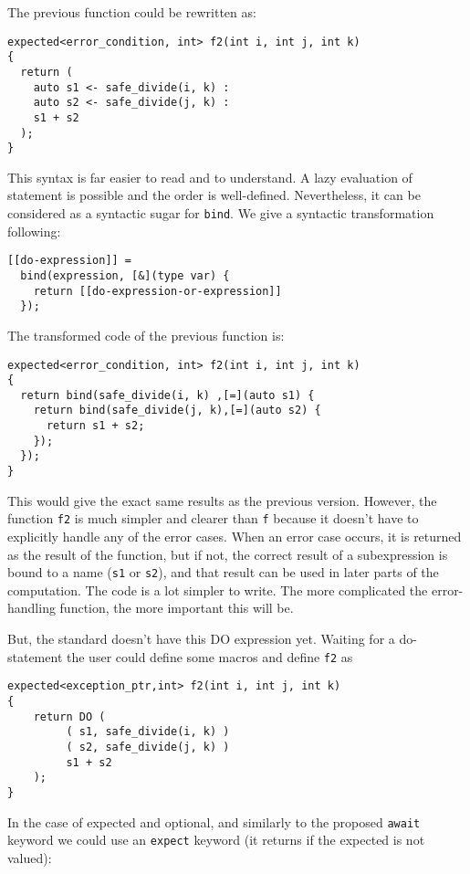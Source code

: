 \documentclass[a4paper,10pt]{article}
\newcommand{\cpp}[1]{\lstinline{#1}}
\begin{document}
\noindent
The previous function could be rewritten as:

\begin{lstlisting}
expected<error_condition, int> f2(int i, int j, int k)
{
  return (
    auto s1 <- safe_divide(i, k) :
    auto s2 <- safe_divide(j, k) :
    s1 + s2
  );
}
\end{lstlisting}

This syntax is far easier to read and to understand. A lazy evaluation of statement is possible and the order is well-defined. Nevertheless, it can be considered as a syntactic sugar for \cpp{bind}. We give a syntactic transformation following:

\begin{lstlisting}
[[do-expression]] =
  bind(expression, [&](type var) {
    return [[do-expression-or-expression]]
  });
\end{lstlisting}
\noindent
The transformed code of the previous function is:

\begin{lstlisting}
expected<error_condition, int> f2(int i, int j, int k)
{
  return bind(safe_divide(i, k) ,[=](auto s1) {
    return bind(safe_divide(j, k),[=](auto s2) {
      return s1 + s2;
    });
  }); 
}
\end{lstlisting}

This would give the exact same results as the previous version. However, the function \cpp{f2} is much simpler and clearer than \cpp{f} because it doesn't have to explicitly handle any of the error cases. When an error case occurs, it is returned as the result of the function, but if not, the correct result of a subexpression is bound to a name (\cpp{s1} or \cpp{s2}), and that result can be used in later parts of the computation. The code is a lot simpler to write. The more complicated the error-handling function, the more important this will be.

But, the standard doesn't have this DO expression yet.
Waiting for a do-statement the user could define some macros and define \cpp{f2} as

\begin{lstlisting}
expected<exception_ptr,int> f2(int i, int j, int k)
{
    return DO (
         ( s1, safe_divide(i, k) )
         ( s2, safe_divide(j, k) )
         s1 + s2 
    );
}
\end{lstlisting}

In the case of expected and optional, and similarly to the proposed \cpp{await} keyword we could use an \cpp{expect} keyword (it returns if the expected is not valued):
\end{document}
